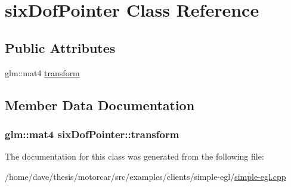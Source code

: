 \hypertarget{classsixDofPointer}{\section{six\-Dof\-Pointer Class Reference}
\label{classsixDofPointer}
}
\subsection*{Public Attributes}
\begin{DoxyCompactItemize}
\item 
glm\-::mat4 \hyperlink{classsixDofPointer_ab3bb1b8ac72a9d575265f454d43ada9f}{transform}
\end{DoxyCompactItemize}


\subsection{Member Data Documentation}
\hypertarget{classsixDofPointer_ab3bb1b8ac72a9d575265f454d43ada9f}{
\subsubsection[{transform}]{\setlength{\rightskip}{0pt plus 5cm}glm\-::mat4 six\-Dof\-Pointer\-::transform}}\label{classsixDofPointer_ab3bb1b8ac72a9d575265f454d43ada9f}


The documentation for this class was generated from the following file\-:\begin{DoxyCompactItemize}
\item 
/home/dave/thesis/motorcar/src/examples/clients/simple-\/egl/\hyperlink{simple-egl_8cpp}{simple-\/egl.\-cpp}\end{DoxyCompactItemize}
